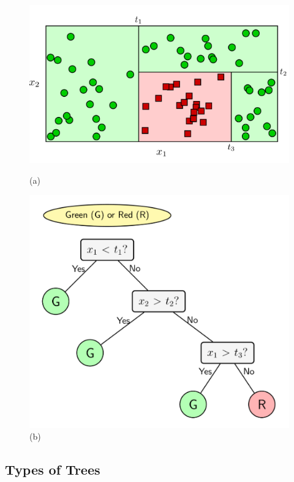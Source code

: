\begin{figure}[H]
	\begin{minipage}{0.45\textwidth}
		\centering
		\includegraphics[width=\linewidth]{figures/decision-tree-classification-1}
		\caption{(a)}
	\end{minipage}
	\hfill
	\begin{minipage}{0.45\textwidth}
		\centering
		\includegraphics[width=\linewidth]{figures/decision-tree-classification-2}
		\caption{(b)}
	\end{minipage}
\end{figure}

\subsection{Types of Trees}
